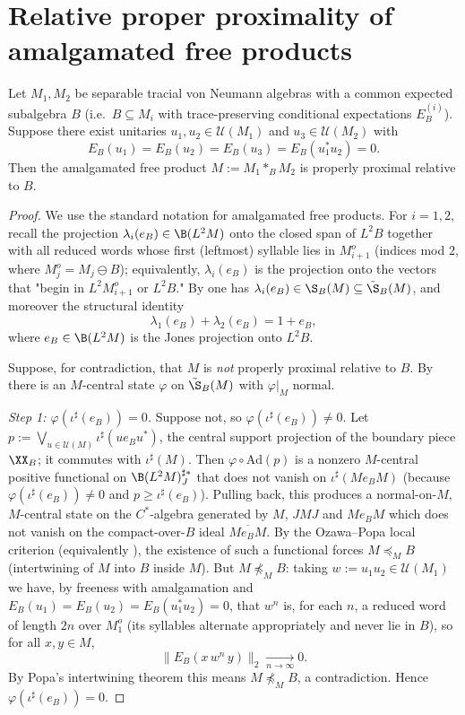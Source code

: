 \section{Relative proper proximality of amalgamated free products}

\begin{lemma}\label{lem:afp-pp}
Let $M_1,M_2$ be separable tracial von Neumann algebras with a common expected subalgebra
$B$ (i.e.\ $B\subseteq M_i$ with trace-preserving conditional expectations $E_B^{(i)}$).
Suppose there exist unitaries $u_1,u_2\in\mathcal U(M_1)$ and $u_3\in\mathcal U(M_2)$ with
\[
E_B(u_1)=E_B(u_2)=E_B(u_3)=E_B(u_1^*u_2)=0 .
\]
Then the amalgamated free product $M:=M_1\ast_B M_2$ is properly proximal relative to $B$.
\end{lemma}

\begin{proof}
We use the standard notation for amalgamated free products. For $i=1,2$, recall the
projection $\lambda_i(e_B)\in\B(L^2M)$ onto the closed span of $L^2B$ together with all
reduced words whose first (leftmost) syllable lies in $M_{i+1}^o$ (indices mod $2$, where
$M^o_j=M_j\ominus B$); equivalently, $\lambda_i(e_B)$ is the projection onto the vectors
that "begin in $L^2M_{i+1}^o$ or $L^2B$." By \cite[Prop.~4.16]{toyosawa2025relative} one has
$\lambda_i(e_B)\in\S_B(M)\subseteq\tilde\S_B(M)$, and moreover the structural identity
\begin{equation}\label{eq:lambda-sum}
\lambda_1(e_B)+\lambda_2(e_B)=1+e_B ,
\end{equation}
where $e_B\in\B(L^2M)$ is the Jones projection onto $L^2B$.

Suppose, for contradiction, that $M$ is \emph{not} properly proximal relative to $B$. By
\cite[Lemma 8.5]{DKEP23} there is an $M$-central state $\varphi$ on $\tilde\S_B(M)$ with
$\varphi|_M$ normal.

\medskip
\emph{Step 1: $\varphi(\iota^\sharp(e_B))=0$.}
Suppose not, so $\varphi(\iota^\sharp(e_B))\neq0$. Let
$p:=\bigvee_{u\in\mathcal U(M)}\iota^\sharp(u e_B u^*)$, the central support projection of the
boundary piece $\XX_B$; it commutes with $\iota^\sharp(M)$. Then
$\varphi\circ\mathrm{Ad}(p)$ is a nonzero $M$-central positive functional on
$\B(L^2M)^{\sharp*}_J$ that does not vanish on $\iota^\sharp(Me_BM)$ (because
$\varphi(\iota^\sharp(e_B))\neq0$ and $p\ge\iota^\sharp(e_B)$). Pulling back, this produces a
normal-on-$M$, $M$-central state on the $C^*$-algebra generated by $M$, $JMJ$ and $Me_BM$
which does not vanish on the compact-over-$B$ ideal $\overline{Me_BM}$. By the
Ozawa--Popa local criterion \cite[Lemma 3.3]{OP10b} (equivalently
\cite[Thm.~2]{BH18amenableabsorption}), the existence of such a functional forces
$M\preceq_M B$ (intertwining of $M$ into $B$ inside $M$).
But $M\not\preceq_M B$: taking $w:=u_1u_2\in\mathcal U(M_1)$ we have, by freeness with
amalgamation and $E_B(u_1)=E_B(u_2)=E_B(u_1^*u_2)=0$, that $w^n$ is, for each $n$, a reduced
word of length $2n$ over $M_1^o$ (its syllables alternate appropriately and never lie in
$B$), so for all $x,y\in M$,
\[
\|E_B(x\,w^n\,y)\|_2\xrightarrow[n\to\infty]{}0 .
\]
By Popa's intertwining theorem this means $M\not\preceq_M B$, a contradiction. Hence
$\varphi(\iota^\sharp(e_B))=0$.


\end{proof}
